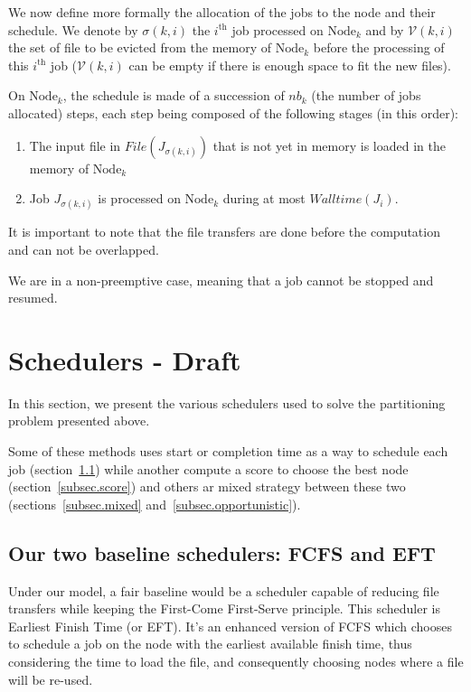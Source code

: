\documentclass[conference,10pt]{IEEEtran}
\newcommand{\Node}[1]{\ensuremath{\mathrm{Node}_{#1}}\xspace}
\newcommand{\file}{\ensuremath{\mathit{File}}\xspace}
\newcommand{\walltime}{\mathit{Walltime}\xspace}
\newcommand{\evict}{\ensuremath{\mathcal{V}}\xspace}
\begin{document}
We now define more formally the allocation of the jobs to the node and
their schedule.
We denote by $\sigma(k,i)$ the $i^\text{th}$ job
processed on $\Node{k}$ and by $\evict(k,i)$ the set of file to
be evicted from the memory of $\Node{k}$ before the processing
of this $i^\text{th}$ job ($\evict(k,i)$ can be empty if there is enough space to fit the new files).

On $\Node{k}$, the schedule is made of a
succession of $\mathit{nb}_k$ (the number of jobs allocated) steps, each step being composed of the
following stages (in this order):
\begin{enumerate}
\item The input file in $\file(J_{\sigma(k,i)})$ that is not yet in memory is loaded in the memory of $\Node{k}$
\item Job $J_{\sigma(k,i)}$ is processed on $\Node{k}$ during at most $\walltime(J_i)$.
\end{enumerate}
It is important to note that the file transfers are done before the computation and can not be overlapped.

We are in a non-preemptive case, meaning that a job cannot be stopped and resumed.

\section{Schedulers - Draft}\label{sec.schedulers}

In this section, we present the various schedulers used to solve
the partitioning problem presented above. 

Some of these methods uses start or completion time as a way to
schedule each job (section~\ref{subsec.fcfs_eft}) while another compute 
a score to choose the best node (section~\ref{subsec.score}) and others
ar mixed strategy between these two (sections~\ref{subsec.mixed} and~\ref{subsec.opportunistic}).

\subsection{Our two baseline schedulers: FCFS and EFT}\label{subsec.fcfs_eft}

Under our model, a fair baseline would be a scheduler capable
of reducing file transfers while keeping the First-Come First-Serve 
principle. This scheduler is Earliest Finish Time (or EFT).
It's an enhanced version of FCFS which chooses to schedule a job
on the node with the earliest available finish time, thus considering
the time to load the file, and consequently choosing nodes where a file will
be re-used. 
\end{document}
